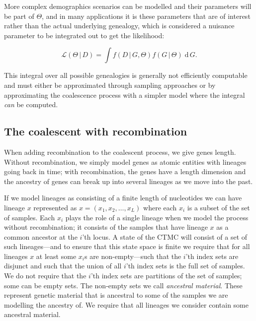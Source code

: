 \documentclass[graybox]{svmult}
\newcommand{\G}{\ensuremath{G}}
\renewcommand{\D}{\ensuremath{D}}
\renewcommand{\lhd}{\ensuremath{\mathcal{L}}}
\newcommand{\intd}{\ensuremath{\mathrm{\;d\,}}}
\begin{document}
More complex demographics scenarios can be modelled and their parameters will be part of $\Theta$, and in many applications it is these parameters that are of interest rather than the actual underlying genealogy, which is considered a nuisance parameter to be integrated out to get the likelihood:

\begin{equation}
	\label{eq:likelihood-integral}
    \lhd(\Theta\,|\,\D) = \int f(\D\,|\,\G,\Theta) f(\G\,|\,\Theta) \intd\G .
\end{equation}

This integral over all possible genealogies is generally not efficiently computable and must either be approximated through sampling approaches or by approximating the coalescence process with a simpler model where the integral \emph{can} be computed. 


\subsection{The coalescent with recombination}

When adding recombination to the coalescent process, we give genes length. Without recombination, we simply model genes as atomic entities with lineages going back in time; with recombination, the genes have a length dimension and the ancestry of genes can break up into several lineages as we move into the past.

If we model lineages as consisting of a finite length of nucleotides we can have lineage $x$ represented as $x=(x_1,x_2,\ldots,x_L)$ where each $x_i$ is a subset of the set of samples. Each $x_i$ plays the role of a single lineage when we model the process without recombination; it consists of the samples that have lineage $x$ as a common ancestor at the $i$'th locus. A state of the CTMC will consist of a set of such lineages---and to ensure that this state space is finite we require that for all lineages $x$ at least some $x_i$s are non-empty---such that the $i$'th index sets are disjunct and such that the union of all $i$'th index sets is the full set of samples. We do not require that the $i$'th index sets are partitions of the set of samples; some can be empty sets. The non-empty sets we call \emph{ancestral material}. These represent genetic material that is ancestral to some of the samples we are modelling the ancestry of. We require that all lineages we consider contain some ancestral material.
\end{document}
